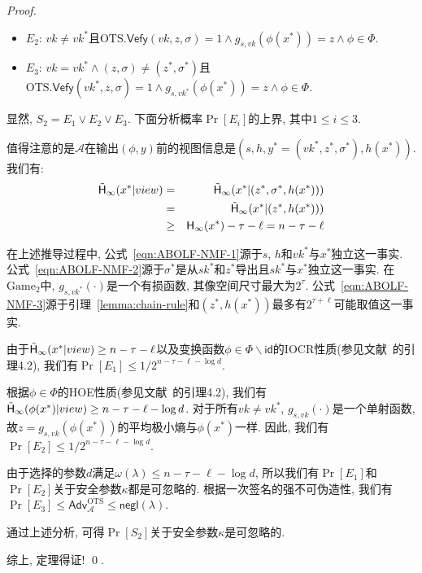 \begin{proof}
\begin{trivlist}
\begin{itemize}
	\item $E_2$: $vk \neq vk^*$且$\text{OTS}.\mathsf{Vefy}(vk, z, \sigma) = 1 \wedge 
		g_{s, vk}(\phi(x^*)) = z \wedge \phi \in \Phi$. 

	\item $E_3$: $vk = vk^* \wedge (z, \sigma) \neq (z^*, \sigma^*)$且$\text{OTS}.\mathsf{Vefy}(vk^*, z, \sigma) = 1 \wedge g_{s, vk^*}(\phi(x^*)) = z \wedge \phi \in \Phi$. 
\end{itemize}
显然, $S_2 = E_1 \vee E_2 \vee E_3$. 下面分析概率$\Pr[E_i]$的上界, 其中$1 \leq i \leq 3$. 

值得注意的是$\mathcal{A}$在输出$(\phi, y)$前的视图信息是$(s, h, y^* = (vk^*, z^*, \sigma^*), h(x^*))$. 我们有: 
\begin{eqnarray}
	\tilde{\mathsf{H}}_\infty(x^*|view) & = & \tilde{\mathsf{H}}_\infty(x^*|(z^*, \sigma^*, h(x^*))) \label{eqn:ABOLF-NMF-1}\\  
							& = & \tilde{\mathsf{H}}_\infty(x^*|(z^*, h(x^*))) \label{eqn:ABOLF-NMF-2}\\	 
						   & \geq & \mathsf{H}_\infty(x^*) - \tau - \ell  = n - \tau - \ell \label{eqn:ABOLF-NMF-3}  
\end{eqnarray}

在上述推导过程中, 公式~\eqref{eqn:ABOLF-NMF-1}源于$s$, $h$和$vk^*$与$x^*$独立这一事实. 公式~\eqref{eqn:ABOLF-NMF-2}源于$\sigma^*$是从$sk^*$和$z^*$导出且$sk^*$与$x^*$独立这一事实. 
在$\text{Game}_2$中, $g_{s, vk^*}(\cdot)$是一个有损函数, 其像空间尺寸最大为$2^\tau$. 公式~\eqref{eqn:ABOLF-NMF-3}源于引理~\ref{lemma:chain-rule}和$(z^*, h(x^*))$最多有$2^{\tau+\ell}$可能取值这一事实. 

由于$\tilde{\mathsf{H}}_\infty(x^*|view) \geq n - \tau - \ell$以及变换函数$\phi \in \Phi \backslash \mathsf{id}$的IOCR性质(参见文献~\cite{ChenQZDC22}的引理4.2), 我们有$\Pr[E_1] \leq 1/2^{n- \tau - \ell - \log d}$.   

根据$\phi \in \Phi$的HOE性质(参见文献~\cite{ChenQZDC22}的引理4.2), 我们有$\tilde{\mathsf{H}}_\infty(\phi(x^*)|view) \geq n- \tau - \ell -\log d$. 对于所有$vk \neq vk^*$, $g_{s, vk}(\cdot)$是一个单射函数, 故$z = g_{s,vk}(\phi(x^*))$的平均极小熵与$\phi(x^*)$一样. 因此, 我们有$\Pr[E_2] \leq 1/2^{n- \tau - \ell - \log d}$.

由于选择的参数$d$满足$\omega(\lambda) \leq n - \tau - \ell - \log d$, 所以我们有$\Pr[E_1]$和$\Pr[E_2]$关于安全参数$\kappa$都是可忽略的. 根据一次签名的强不可伪造性, 我们有$\Pr[E_3] \leq \mathsf{Adv}_\mathcal{A}^\text{OTS} \leq \mathsf{negl}(\lambda)$. 

通过上述分析, 可得$\Pr[S_2]$关于安全参数$\kappa$是可忽略的.      	  
\end{trivlist}

综上, 定理得证! \qed.   
\end{proof}

